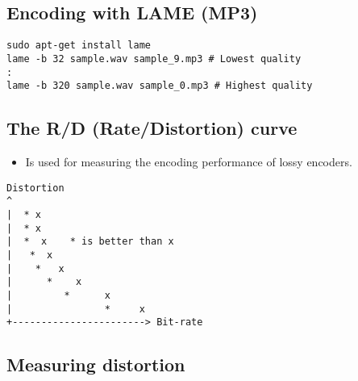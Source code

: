 
\subsection{Encoding with LAME (MP3)}

\begin{lstlisting}
sudo apt-get install lame
lame -b 32 sample.wav sample_9.mp3 # Lowest quality
:
lame -b 320 sample.wav sample_0.mp3 # Highest quality
\end{lstlisting}


\subsection{The R/D (Rate/Distortion) curve}

\begin{itemize}
\item Is used for measuring the encoding performance of lossy encoders.
\end{itemize}
\begin{verbatim}
Distortion
^
|  * x
|  * x
|  *  x    * is better than x
|   *  x
|    *   x
|      *    x
|         *      x
|                *     x
+-----------------------> Bit-rate
\end{verbatim}


\subsection{Measuring distortion}



